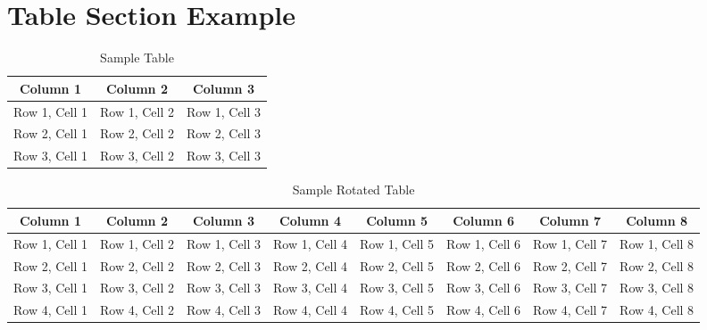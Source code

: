 \documentclass[../../../main.tex]{subfiles}
\begin{document}
\section{Table Section Example}

\begin{table}[!htbp]
    \centering
    \caption{Sample Table}
    \begin{tabular}{|c|c|c|}
        \hline
        \rowcolor[HTML]{C0C0C0} 
        \textbf{Column 1} & \textbf{Column 2} & \textbf{Column 3} \\ \hline
        Row 1, Cell 1     & Row 1, Cell 2     & Row 1, Cell 3     \\ \hline
        Row 2, Cell 1     & Row 2, Cell 2     & Row 2, Cell 3     \\ \hline
        Row 3, Cell 1     & Row 3, Cell 2     & Row 3, Cell 3     \\ \hline
    \end{tabular}
\end{table}

\begin{table}
    \centering
    \caption{Sample Rotated Table}
    \begin{tabular}{|c|c|c|c|c|c|c|c|}
        \hline
        \rowcolor[HTML]{C0C0C0} 
        \textbf{Column 1} & \textbf{Column 2} & \textbf{Column 3} & \textbf{Column 4}  & \textbf{Column 5}  & \textbf{Column 6} & \textbf{Column 7}  & \textbf{Column 8} \\ \hline
        Row 1, Cell 1  & Row 1, Cell 2  & Row 1, Cell 3  & Row 1, Cell 4 & Row 1, Cell 5 & Row 1, Cell 6 & Row 1, Cell 7 & Row 1, Cell 8   \\ \hline
        Row 2, Cell 1  & Row 2, Cell 2  & Row 2, Cell 3  & Row 2, Cell 4 & Row 2, Cell 5 & Row 2, Cell 6 & Row 2, Cell 7 & Row 2, Cell 8   \\ \hline
        Row 3, Cell 1  & Row 3, Cell 2  & Row 3, Cell 3  & Row 3, Cell 4 & Row 3, Cell 5 & Row 3, Cell 6 & Row 3, Cell 7 & Row 3, Cell 8  \\ \hline
        Row 4, Cell 1  & Row 4, Cell 2  & Row 4, Cell 3  & Row 4, Cell 4 & Row 4, Cell 5 & Row 4, Cell 6 & Row 4, Cell 7 & Row 4, Cell 8   \\ \hline
    \end{tabular}
\end{table}
\end{document}
